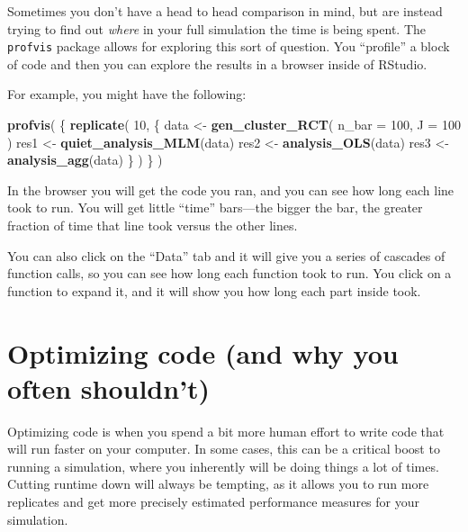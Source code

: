 \documentclass[
]{book}
\newenvironment{Shaded}{\begin{snugshade}}{\end{snugshade}}
\newcommand{\AttributeTok}[1]{\textcolor[rgb]{0.13,0.29,0.53}{#1}}
\newcommand{\DecValTok}[1]{\textcolor[rgb]{0.00,0.00,0.81}{#1}}
\newcommand{\FunctionTok}[1]{\textcolor[rgb]{0.13,0.29,0.53}{\textbf{#1}}}
\newcommand{\NormalTok}[1]{#1}
\newcommand{\OtherTok}[1]{\textcolor[rgb]{0.56,0.35,0.01}{#1}}
\begin{document}
Sometimes you don't have a head to head comparison in mind, but are instead trying to find out \emph{where} in your full simulation the time is being spent.
The \texttt{profvis} package allows for exploring this sort of question.
You ``profile'' a block of code and then you can explore the results in a browser inside of RStudio.

For example, you might have the following:

\begin{Shaded}
\begin{Highlighting}[]
\FunctionTok{profvis}\NormalTok{( \{}
  \FunctionTok{replicate}\NormalTok{( }\DecValTok{10}\NormalTok{, \{ }
\NormalTok{    data }\OtherTok{\textless{}{-}} \FunctionTok{gen\_cluster\_RCT}\NormalTok{( }\AttributeTok{n\_bar =} \DecValTok{100}\NormalTok{, }\AttributeTok{J =} \DecValTok{100}\NormalTok{ )}
\NormalTok{    res1 }\OtherTok{\textless{}{-}} \FunctionTok{quiet\_analysis\_MLM}\NormalTok{(data)}
\NormalTok{    res2 }\OtherTok{\textless{}{-}} \FunctionTok{analysis\_OLS}\NormalTok{(data)}
\NormalTok{    res3 }\OtherTok{\textless{}{-}} \FunctionTok{analysis\_agg}\NormalTok{(data)}
\NormalTok{  \} )}
\NormalTok{\} )}
\end{Highlighting}
\end{Shaded}

In the browser you will get the code you ran, and you can see how long each line took to run.
You will get little ``time'' bars---the bigger the bar, the greater fraction of time that line took versus the other lines.

You can also click on the ``Data'' tab and it will give you a series of cascades of function calls, so you can see how long each function took to run.
You click on a function to expand it, and it will show you how long each part inside took.

\section{Optimizing code (and why you often shouldn't)}\label{optimize-code}

Optimizing code is when you spend a bit more human effort to write code that will run faster on your computer.
In some cases, this can be a critical boost to running a simulation, where you inherently will be doing things a lot of times.
Cutting runtime down will always be tempting, as it allows you to run more replicates and get more precisely estimated performance measures for your simulation.
\end{document}
